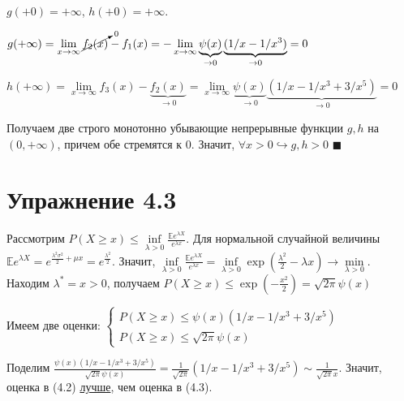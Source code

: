 \documentclass[a4paper]{article}
\begin{document}
$g(+0)=+\infty$, $h(+0)=+\infty$.

$g(+\infty)=\lim\limits_{x\to\infty}\cancelto{0}{f_2(x)}-f_1(x)=-\lim\limits_{x\to\infty}\underbrace{\psi(x)}_{\to 0}\underbrace{(1/x-1/x^3)}_{\to 0}=0$

$h(+\infty)=\lim\limits_{x\to\infty}f_3(x)-\underbrace{f_2(x)}_{\to 0}=\lim\limits_{x\to\infty}\underbrace{\psi(x)}_{\to 0}\underbrace{(1/x-1/x^3+3/x^5)}_{\to 0}=0$

Получаем две строго монотонно убывающие непрерывные функции $g,h$ на $(0,+\infty)$, причем обе стремятся к 0. Значит, $\forall x>0\hookrightarrow g,h>0$ $\blacksquare$

\section*{Упражнение 4.3}
Рассмотрим $P(X\geqslant x)\leqslant\inf\limits_{\lambda > 0}\frac{\mathbb{E}e^{\lambda X}}{e^{\lambda x}}$. Для нормальной случайной величины $\mathbb{E}e^{\lambda X}=e^{\frac{\lambda^2\sigma^2}{2}+\mu x}=e^{\frac{\lambda^2}{2}}$. Значит, $\inf\limits_{\lambda >0}\frac{\mathbb{E}e^{\lambda X}}{e^{\lambda x}}=\inf\limits_{\lambda >0}\exp(\frac{\lambda^2}{2}-\lambda x)\to\min\limits_{\lambda > 0}$. Находим $\lambda^*=x>0$, получаем $P(X\geqslant x)\leqslant \exp(-\frac{x^2}{2})=\sqrt{2\pi}\psi(x)$

Имеем две оценки:
$\begin{cases}
P(X\geqslant x)\leqslant \psi(x)(1/x-1/x^3+3/x^5)\\
P(X\geqslant x)\leqslant \sqrt{2\pi}\psi(x)
\end{cases}$

Поделим $\frac{\psi(x)(1/x-1/x^3+3/x^5)}{\sqrt{2\pi}\psi(x)}=\frac{1}{\sqrt{2\pi}}(1/x-1/x^3+3/x^5)\sim\frac{1}{\sqrt{2\pi}x}$. Значит, оценка в (4.2) \underline{лучше}, чем оценка в (4.3).
\end{document}
